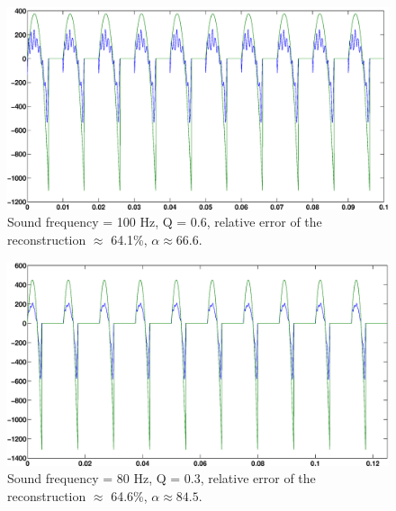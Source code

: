 \documentclass[12pt,a4]{article}
\begin{document}
\begin{figure}[H]
\begin{center}
\includegraphics[scale=.3]{img/morozov_no-crime_error-005_Qrand-0[Pres].eps}
\end{center}
\caption{Sound frequency = 100 Hz, Q = 0.6, relative error of the reconstruction $\approx$ 64.1\%, $\alpha \approx 66.6$.}
\label{fig:tik-3}
\end{figure}
\begin{figure}[H]
\begin{center}
\includegraphics[scale=.3]{img/morozov_no-crime_error-005_Qrand-0[Pres-V4].eps}
\end{center}
\caption{Sound frequency = 80 Hz, Q = 0.3, relative error of the reconstruction $\approx$ 64.6\%, $\alpha \approx 84.5$.}
\label{fig:tik-4}
\end{figure}
\end{document}
